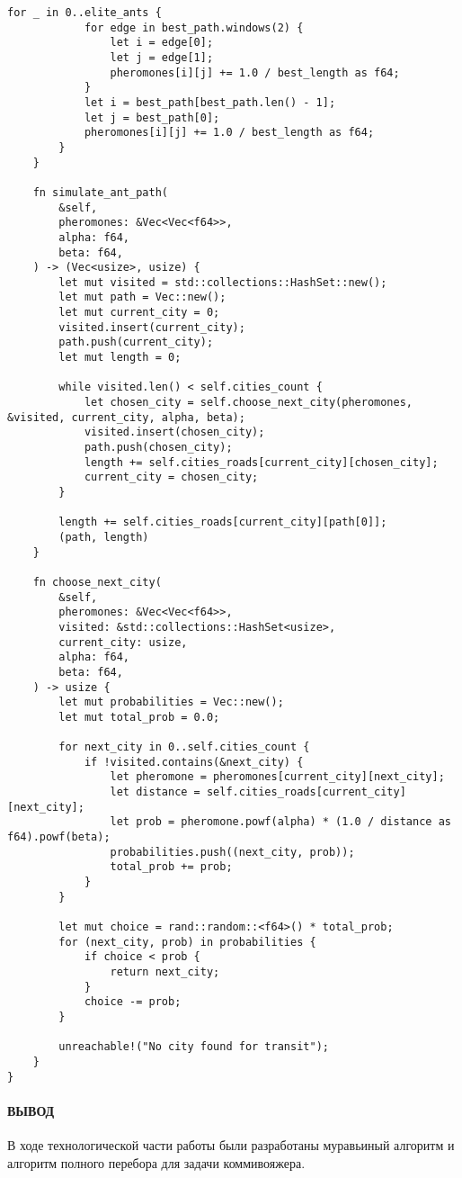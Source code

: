 \begin{center}
\begin{lstlisting}[label=lst:ant_colony,caption=муравьиный алгоритм]
        for _ in 0..elite_ants {
            for edge in best_path.windows(2) {
                let i = edge[0];
                let j = edge[1];
                pheromones[i][j] += 1.0 / best_length as f64;
            }
            let i = best_path[best_path.len() - 1];
            let j = best_path[0];
            pheromones[i][j] += 1.0 / best_length as f64;
        }
    }    

    fn simulate_ant_path(
        &self,
        pheromones: &Vec<Vec<f64>>,
        alpha: f64,
        beta: f64,
    ) -> (Vec<usize>, usize) {
        let mut visited = std::collections::HashSet::new();
        let mut path = Vec::new();
        let mut current_city = 0;
        visited.insert(current_city);
        path.push(current_city);
        let mut length = 0;

        while visited.len() < self.cities_count {
            let chosen_city = self.choose_next_city(pheromones, &visited, current_city, alpha, beta);
            visited.insert(chosen_city);
            path.push(chosen_city);
            length += self.cities_roads[current_city][chosen_city];
            current_city = chosen_city;
        }

        length += self.cities_roads[current_city][path[0]];
        (path, length)
    }

    fn choose_next_city(
        &self,
        pheromones: &Vec<Vec<f64>>,
        visited: &std::collections::HashSet<usize>,
        current_city: usize,
        alpha: f64,
        beta: f64,
    ) -> usize {
        let mut probabilities = Vec::new();
        let mut total_prob = 0.0;

        for next_city in 0..self.cities_count {
            if !visited.contains(&next_city) {
                let pheromone = pheromones[current_city][next_city];
                let distance = self.cities_roads[current_city][next_city];
                let prob = pheromone.powf(alpha) * (1.0 / distance as f64).powf(beta);
                probabilities.push((next_city, prob));
                total_prob += prob;
            }
        }

        let mut choice = rand::random::<f64>() * total_prob;
        for (next_city, prob) in probabilities {
            if choice < prob {
                return next_city;
            }
            choice -= prob;
        }

        unreachable!("No city found for transit");
    }
}
\end{lstlisting}
\end{center}

\paragraph*{ВЫВОД} ${}$ \\

В ходе технологической части работы были разработаны муравьиный алгоритм и алгоритм полного перебора для задачи коммивояжера.
